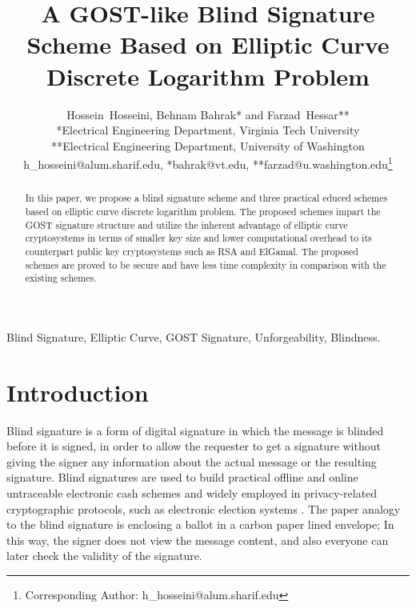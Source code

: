 \documentclass[journal,onecolumn,draftcls]{IEEEtran}
\begin{document}
\title{A GOST-like Blind Signature Scheme Based on Elliptic Curve Discrete Logarithm Problem}


\author{ Hossein~Hosseini, Behnam Bahrak* and Farzad~Hessar**\\ 
				*Electrical Engineering Department, Virginia Tech University\\ 
**Electrical Engineering Department, University of Washington\\
        h\_hosseini@alum.sharif.edu, *bahrak@vt.edu, **farzad@u.washington.edu\thanks{Corresponding Author: h\_hosseini@alum.sharif.edu}
}

\maketitle


\begin{abstract}
In this paper, we propose a blind signature scheme and three practical educed schemes based on elliptic curve discrete logarithm problem. The proposed schemes impart the GOST signature structure and utilize the inherent advantage of elliptic curve cryptosystems in terms of smaller key size and lower computational overhead to its counterpart public key cryptosystems such as RSA and ElGamal. The proposed schemes are proved to be secure and have less time complexity in comparison with the existing schemes.
\end{abstract}

\begin{IEEEkeywords}
Blind Signature, Elliptic Curve, GOST Signature, Unforgeability, Blindness.
\end{IEEEkeywords}

\IEEEpeerreviewmaketitle

\section{Introduction}
Blind signature is a form of digital signature in which the message is blinded before it is signed, in order to allow the requester to get a signature without giving the signer any information about the actual message or the resulting signature. Blind signatures are used to build practical offline and online untraceable electronic cash schemes \cite{Chaum90, Ferguson94, Frankel96, Radu97} and widely employed in privacy-related cryptographic protocols, such as electronic election systems \cite{Chaum84}. The paper analogy to the blind signature is  enclosing a ballot in a carbon paper lined envelope; In this way, the signer does not view the message content, and also everyone can later check the validity of the signature.
\end{document}
